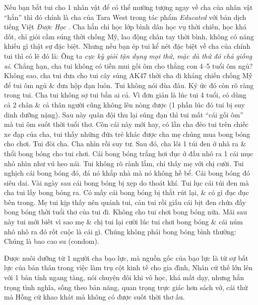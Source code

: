 \documentclass[12pt,twoside]{book}
\begin{document}
Nếu bạn bắt tui cho 1 nhân vật để có thể mường tượng ngay về cha của nhân vật ``hắn'' thì đó chính là cha của {\sc Tara West} trong tác phẩm {\it Educated} \cite{Westover_educated} với bản dịch tiếng Việt {\it Được Học} \cite{Westover_educated_VN}. Cha hắn chỉ học lớp bình dân học vụ thời chiến, học khá dốt, chỉ giỏi cầm súng thời chống Mỹ, lao động chân tay thời bình, không có năng khiếu gì thật sự đặc biệt. Nhưng nếu bạn ép tui kể nét đặc biệt về cha của chính tui thì có lẽ đó là: Ông ta {\it cực kỳ giỏi tận dụng mọi thứ, mặc dù thứ đó chả giống ai}. Chẳng hạn, cha tui không có tiền mui gối ôm cho thằng con 4--5 tuổi ôm ngủ? Không sao, cha tui đưa cho tui cây súng AK47 thời cha đi kháng chiến chống Mỹ để tui ôm ngủ \& đưa hộp đạn luôn. Tui không nói đùa đâu. Ký ức đó còn rõ ràng trong tui. Cha tui không sợ tui bắn ai cả. Vì đơn giản là lúc tui 4 tuổi, có dùng cả 2 chân \& cả thân người cũng không lên nòng được (1 phần lúc đó tui bị suy dinh dưỡng nặng). Sau này quân đội thu lại súng đạn thì tui mất ``cái gối ôm'' mà tui ôm suốt thời tuổi thơ. Còn cái này mới hay, có lần cha đèo tui trên chiếc xe đạp của cha, tui thấy những đứa trẻ khác được cha mẹ chúng mua bong bóng cho chơi. Tui đòi cha. Cha nhìn rồi suy tư. Sau đó, cha lôi 1 túi đen ở nhà ra \& thổi bong bóng cho tui chơi. Cái bong bóng trắng hơi đục ở đầu nhô ra 1 cái mục nhỏ nhìn như vú heo nái. Tui không rõ rành lắm, chỉ thấy mẹ với chị cười. Tui nghịch cái bong bóng đó, đá nó khắp nhà mà nó không hề bể. Cái bong bóng đó siêu dai. Vài ngày sau cái bong bóng bị xẹp do thoát khí. Tui lục cái túi đen mà cha tui lấy bong bóng ra. Có mấy cái bong bóng bị thắt rút lại, \& có gì đục đục bên trong. Mẹ tui kịp thấy nên quánh tui, cản tui rồi giấu cái bịt đen chứa đầy bong bóng thời tuổi thơ của tui đi. Không cho tui chơi bong bóng nữa. Mãi sau này tui mới biết vì sao mẹ \& chị tui lại cười lúc tui chơi bong bóng \& cái núm nhô nhô ra đó rốt cuộc là cái gì. Chúng không phải bong bóng bình thường: Chúng là bao cao su (condom).

Được nuôi dưỡng từ 1 người cha bạo lực, mà nguồn gốc của bạo lực là từ sự bất lực của bản thân trong việc làm trụ cột kinh tế cho gia đình, {\sf Nhân} cứ thế lớn lên với 1 bản tính ngang tàng, nói chuyện đôi khi vô học, khá mất dạy, nhưng hắn trọng tình nghĩa, sống theo bản năng, quan trọng trực giác hơn sách vở, cái thứ mà {\sf Hồng} cứ khao khát mà không có được suốt thời thơ ấu.
\end{document}
